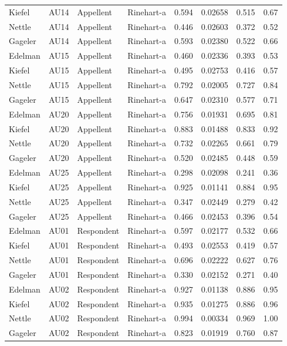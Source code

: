 \documentclass{monashthesis}
\begin{document}
\begin{center}
\begin{longtable}{llllllll}
Kiefel & AU14 & Appellent & Rinehart-a & 0.594 & 0.02658 & 0.515 & 0.67 \\
Nettle & AU14 & Appellent & Rinehart-a & 0.446 & 0.02603 & 0.372 & 0.52 \\
Gageler & AU14 & Appellent & Rinehart-a & 0.593 & 0.02380 & 0.522 & 0.66 \\
Edelman & AU15 & Appellent & Rinehart-a & 0.460 & 0.02336 & 0.393 & 0.53 \\
Kiefel & AU15 & Appellent & Rinehart-a & 0.495 & 0.02753 & 0.416 & 0.57 \\
Nettle & AU15 & Appellent & Rinehart-a & 0.792 & 0.02005 & 0.727 & 0.84 \\
Gageler & AU15 & Appellent & Rinehart-a & 0.647 & 0.02310 & 0.577 & 0.71 \\
Edelman & AU20 & Appellent & Rinehart-a & 0.756 & 0.01931 & 0.695 & 0.81 \\
Kiefel & AU20 & Appellent & Rinehart-a & 0.883 & 0.01488 & 0.833 & 0.92 \\
Nettle & AU20 & Appellent & Rinehart-a & 0.732 & 0.02265 & 0.661 & 0.79 \\
Gageler & AU20 & Appellent & Rinehart-a & 0.520 & 0.02485 & 0.448 & 0.59 \\
Edelman & AU25 & Appellent & Rinehart-a & 0.298 & 0.02098 & 0.241 & 0.36 \\
Kiefel & AU25 & Appellent & Rinehart-a & 0.925 & 0.01141 & 0.884 & 0.95 \\
Nettle & AU25 & Appellent & Rinehart-a & 0.347 & 0.02449 & 0.279 & 0.42 \\
Gageler & AU25 & Appellent & Rinehart-a & 0.466 & 0.02453 & 0.396 & 0.54 \\
Edelman & AU01 & Respondent & Rinehart-a & 0.597 & 0.02177 & 0.532 & 0.66 \\
Kiefel & AU01 & Respondent & Rinehart-a & 0.493 & 0.02553 & 0.419 & 0.57 \\
Nettle & AU01 & Respondent & Rinehart-a & 0.696 & 0.02222 & 0.627 & 0.76 \\
Gageler & AU01 & Respondent & Rinehart-a & 0.330 & 0.02152 & 0.271 & 0.40 \\
Edelman & AU02 & Respondent & Rinehart-a & 0.927 & 0.01138 & 0.886 & 0.95 \\
Kiefel & AU02 & Respondent & Rinehart-a & 0.935 & 0.01275 & 0.886 & 0.96 \\
Nettle & AU02 & Respondent & Rinehart-a & 0.994 & 0.00334 & 0.969 & 1.00 \\
Gageler & AU02 & Respondent & Rinehart-a & 0.823 & 0.01919 & 0.760 & 0.87 \\

\end{longtable}
\end{center}
\end{document}
